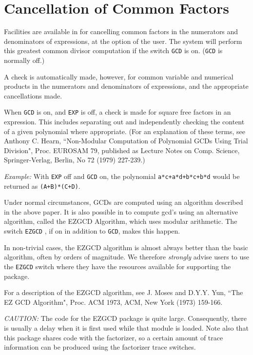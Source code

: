 \section{Cancellation of Common Factors}
Facilities are available in {\REDUCE} for cancelling common factors in the
numerators and denominators of expressions, at the option of the user. The
system will perform this greatest common divisor computation if the switch
{\tt GCD}  is on. ({\tt GCD} is normally off.)

A check is automatically made, however, for common variable and numerical
products in the numerators and denominators of expressions, and the
appropriate cancellations made.

When {\tt GCD} is on, and {\tt EXP} is off, a check is made for square
free factors in an expression.  This includes separating out and
independently checking the content of a given polynomial where
appropriate. (For an explanation of these terms, see Anthony C. Hearn,
``Non-Modular Computation of Polynomial GCDs Using Trial Division", Proc.
EUROSAM 79, published as Lecture Notes on Comp.  Science, Springer-Verlag,
Berlin, No 72 (1979) 227-239.)

{\it Example:} With {\tt EXP}  off and {\tt GCD} 
on,
the polynomial {\tt a*c+a*d+b*c+b*d} would be returned as {\tt (A+B)*(C+D)}.

Under normal circumstances, GCDs are computed using an algorithm described
in the above paper. It is also possible in {\REDUCE} to compute gcd's using
an alternative algorithm, called the EZGCD Algorithm, which uses modular
arithmetic.  The switch {\tt EZGCD} , if on in addition to
{\tt GCD}, makes this happen.

In non-trivial cases, the EZGCD algorithm is almost always better
than the basic algorithm, often by orders of magnitude.  We therefore
{\em strongly} advise users to use the {\tt EZGCD} switch where they have the
resources available for supporting the package.

For a description of the EZGCD algorithm, see J. Moses and D.Y.Y. Yun,
``The EZ GCD Algorithm", Proc. ACM 1973, ACM, New York (1973) 159-166.

{\it CAUTION:} The code for the EZGCD package is quite large. Consequently,
there is usually a delay when it is first used while that module is
loaded. Note also that this package shares code with the factorizer, so a
certain amount of trace information can be produced using the factorizer
trace switches.

